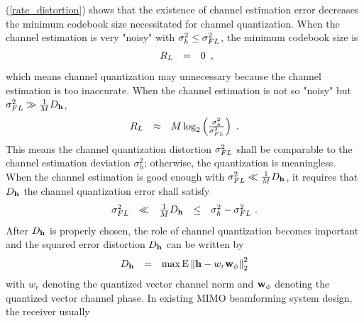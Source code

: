 \documentclass[10pt,fleqn, twocolumn]{IEEEtran}
\newcommand{\bh}{{\bf h}}
\newcommand{\bw}{{\bf w}}
\begin{document}
(\ref{rate_distortion}) shows that the existence of channel
estimation error decreases the minimum codebook size necessitated
for channel quantization. When the channel estimation is very
"noisy" with $\sigma_{h}^{2}\leq\sigma_{\mbox{\tiny FL}}^{2}$, the
minimum codebook size is
\begin{equation}%
\begin{array}{rcl}
R_{\mbox{\tiny L}}&=&0
\end{array},
\end{equation}
\noindent which means channel quantization may unnecessary because
the channel estimation is too inaccurate. When the channel
estimation is not so "noisy" but $\sigma_{\mbox{\tiny
FL}}^{2}\gg\frac{1}{M}D_{\bh}$,
\begin{equation}%
\begin{array}{rcl}
R_{\mbox{\tiny
L}}&\approx&M\log_{2}\left(\frac{\sigma_{h}^{2}}{\sigma_{\mbox{\tiny
FL}}^{2}}\right)\ .
\end{array}
\end{equation}
\noindent This means the channel quantization distortion
$\sigma_{\mbox{\tiny FL}}^{2}$ shall be comparable to the channel
estimation deviation $\sigma_{h}^{2}$; otherwise, the quantization
is meaningless. When the channel estimation is good enough with
$\sigma_{\mbox{\tiny FL}}^{2}\ll\frac{1}{M}D_{\bh}$, it requires
that $D_{\bh}$ the channel quantization error shall satisfy
\begin{equation}%
\begin{array}{rcccl}
\sigma_{\mbox{\tiny
FL}}^{2}&\ll&\frac{1}{M}D_{\bh}&\leq&\sigma_{h}^{2}-\sigma_{\mbox{\tiny
FL}}^{2}\ .
\end{array}
\end{equation}
\noindent After $D_{\bh}$ is properly chosen, the role of channel
quantization becomes important and the squared error distortion
$D_{\bh}$ can be written by
\begin{equation}%
\begin{array}{rcl}
D_{\bh}&=&\max{\rm E}\left\|\bh -
w_{r}{\bw}_{\phi}\right\|_{2}^{2}
\end{array}\label{D_h}
\end{equation}
\noindent with $w_{r}$ denoting the quantized vector channel norm
and ${\bw}_{\phi}$ denoting the quantized vector channel phase. In
existing MIMO beamforming system design, the receiver usually
\end{document}

